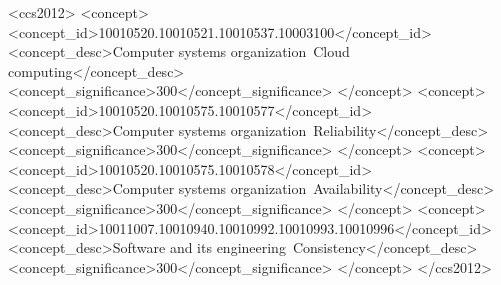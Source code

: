 \author{Vasilis Gavrielatos, Antonios Katsarakis, Vijay Nagarajan}




\begin{CCSXML}
<ccs2012>
<concept>
<concept_id>10010520.10010521.10010537.10003100</concept_id>
<concept_desc>Computer systems organization~Cloud computing</concept_desc>
<concept_significance>300</concept_significance>
</concept>
<concept>
<concept_id>10010520.10010575.10010577</concept_id>
<concept_desc>Computer systems organization~Reliability</concept_desc>
<concept_significance>300</concept_significance>
</concept>
<concept>
<concept_id>10010520.10010575.10010578</concept_id>
<concept_desc>Computer systems organization~Availability</concept_desc>
<concept_significance>300</concept_significance>
</concept>
<concept>
<concept_id>10011007.10010940.10010992.10010993.10010996</concept_id>
<concept_desc>Software and its engineering~Consistency</concept_desc>
<concept_significance>300</concept_significance>
</concept>
</ccs2012>
\end{CCSXML}


